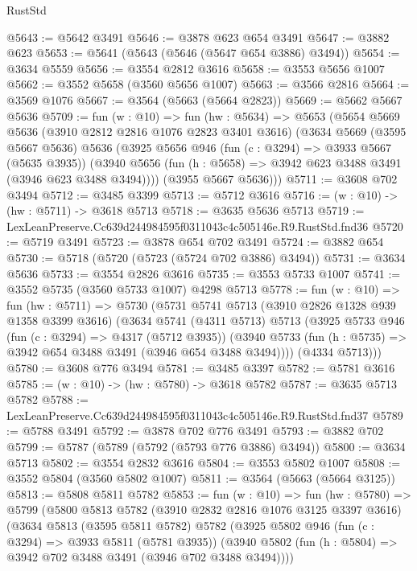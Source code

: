 \begin{lexlean}{RustStd}
\begin{coremodule}
@5643 := @5642 @3491
@5646 := @3878 @623 @654 @3491
@5647 := @3882 @623
@5653 := @5641 (@5643 (@5646 (@5647 @654 @3886) @3494))
@5654 := @3634 @5559
@5656 := @3554 @2812 @3616
@5658 := @3553 @5656 @1007
@5662 := @3552 @5658 (@3560 @5656 @1007)
@5663 := @3566 @2816
@5664 := @3569 @1076
@5667 := @3564 (@5663 (@5664 @2823))
@5669 := @5662 @5667 @5636
@5709 := fun (w : @10) =>
  fun (hw : @5634) =>
  @5653
    (@5654
      @5669
      @5636
      (@3910 @2812 @2816 @1076 @2823 @3401 @3616)
      (@3634
        @5669
        (@3595 @5667 @5636)
        @5636
        (@3925
          @5656
          @946
          (fun (c : @3294) => @3933 @5667 (@5635 @3935))
          (@3940 @5656 (fun (h : @5658) => @3942 @623 @3488 @3491 (@3946 @623 @3488 @3494))))
        (@3955 @5667 @5636)))
@5711 := @3608 @702 @3494
@5712 := @3485 @3399
@5713 := @5712 @3616
@5716 := (w : @10) -> (hw : @5711) -> @3618 @5713
@5718 := @3635 @5636 @5713
@5719 := LexLeanPreserve.Cc639d244984595f0311043c4c505146e.R9.RustStd.fnd36
@5720 := @5719 @3491
@5723 := @3878 @654 @702 @3491
@5724 := @3882 @654
@5730 := @5718 (@5720 (@5723 (@5724 @702 @3886) @3494))
@5731 := @3634 @5636
@5733 := @3554 @2826 @3616
@5735 := @3553 @5733 @1007
@5741 := @3552 @5735 (@3560 @5733 @1007) @4298 @5713
@5778 := fun (w : @10) =>
  fun (hw : @5711) =>
  @5730
    (@5731
      @5741
      @5713
      (@3910 @2826 @1328 @939 @1358 @3399 @3616)
      (@3634
        @5741
        (@4311 @5713)
        @5713
        (@3925
          @5733
          @946
          (fun (c : @3294) => @4317 (@5712 @3935))
          (@3940 @5733 (fun (h : @5735) => @3942 @654 @3488 @3491 (@3946 @654 @3488 @3494))))
        (@4334 @5713)))
@5780 := @3608 @776 @3494
@5781 := @3485 @3397
@5782 := @5781 @3616
@5785 := (w : @10) -> (hw : @5780) -> @3618 @5782
@5787 := @3635 @5713 @5782
@5788 := LexLeanPreserve.Cc639d244984595f0311043c4c505146e.R9.RustStd.fnd37
@5789 := @5788 @3491
@5792 := @3878 @702 @776 @3491
@5793 := @3882 @702
@5799 := @5787 (@5789 (@5792 (@5793 @776 @3886) @3494))
@5800 := @3634 @5713
@5802 := @3554 @2832 @3616
@5804 := @3553 @5802 @1007
@5808 := @3552 @5804 (@3560 @5802 @1007)
@5811 := @3564 (@5663 (@5664 @3125))
@5813 := @5808 @5811 @5782
@5853 := fun (w : @10) =>
  fun (hw : @5780) =>
  @5799
    (@5800
      @5813
      @5782
      (@3910 @2832 @2816 @1076 @3125 @3397 @3616)
      (@3634
        @5813
        (@3595 @5811 @5782)
        @5782
        (@3925
          @5802
          @946
          (fun (c : @3294) => @3933 @5811 (@5781 @3935))
          (@3940 @5802 (fun (h : @5804) => @3942 @702 @3488 @3491 (@3946 @702 @3488 @3494))))

\end{coremodule}
\end{lexlean}

